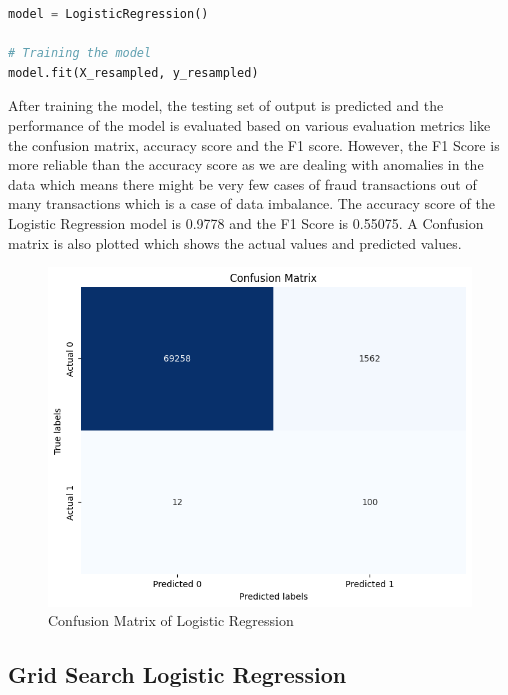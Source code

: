 \begin{lstlisting}[language=Python, caption={Defining and Fitting the model}, label=list:python_code_ex]
model = LogisticRegression()

# Training the model
model.fit(X_resampled, y_resampled)
\end{lstlisting}
 

 
After training the model, the testing set of output is predicted and the performance of the model is evaluated based on various evaluation metrics like the confusion matrix, accuracy score and the F1 score. However, the F1 Score is more reliable than the accuracy score as we are dealing with anomalies in the data which means there might be very few cases of fraud transactions out of many transactions which is a case of data imbalance. The accuracy score of the Logistic Regression model is 0.9778 and the F1 Score is 0.55075. A Confusion matrix is also plotted which shows the actual values and predicted values. 





\begin{figure}[ht]
    \centering
    \includegraphics[scale=0.6]{figures/CM_LogisticRegression.png}
    \caption{Confusion Matrix of Logistic Regression}
    \label{fig:Plot of the Data}
\end{figure}
\clearpage


\subsection{Grid Search Logistic Regression}

